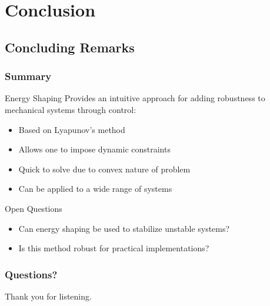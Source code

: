 \section{Conclusion}
\showtoc

\subsection{Concluding Remarks}

\begin{frame}
  \frametitle{Summary}
  \begin{block}{Energy Shaping}
    Provides an intuitive approach for adding robustness to mechanical systems through control:
    \begin{itemize}
      \item Based on Lyapunov's method
      \item Allows one to impose dynamic constraints
      \item Quick to solve due to convex nature of problem
      \item Can be applied to a wide range of systems
    \end{itemize}
  \end{block}

  \begin{block}{Open Questions}
    \begin{itemize}
    \item Can energy shaping be used to stabilize unstable systems?
    \item Is this method robust for practical implementations?
    \end{itemize}
  \end{block}
\end{frame}

\begin{frame}
  \frametitle{Questions?}

  Thank you for listening.
\end{frame}
